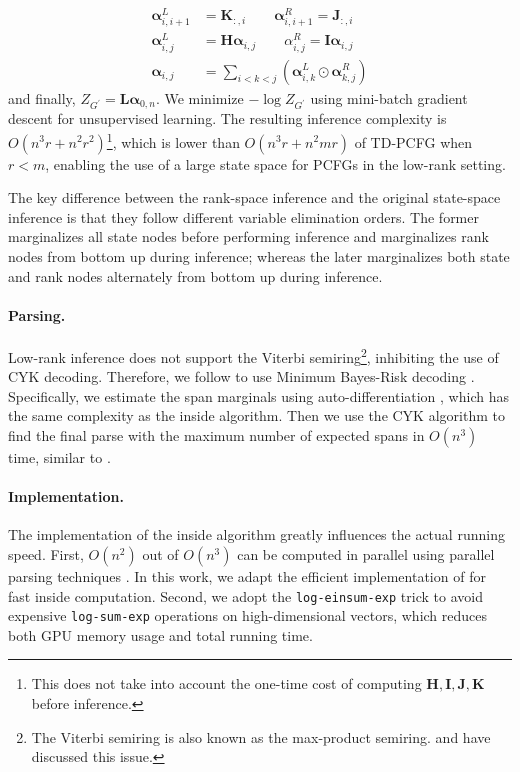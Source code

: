 \documentclass[11pt]{article}
\newcommand{\vect}[1]{\boldsymbol{\mathbf{#1}}}
\begin{document}
\begin{align*}
\vect{\alpha}_{i, i+1}^{L} &= \vect{K}_{:, i} \qquad \vect{\alpha}_{i, i+1}^{R} = \vect{J}_{:, i}\\
\vect{\alpha}_{i, j}^{L} &= \vect{H} \vect{\alpha}_{i, j} \qquad \alpha_{i, j}^{R} = \vect{I} \vect{\alpha}_{i, j} \\
\vect{\alpha}_{i, j} &=  \sum_{i<k<j} (\vect{\alpha}_{i, k}^{L} \odot \vect{\alpha}_{k, j}^{R})
\end{align*}
and finally, $Z_{G^{\prime}}= \vect{L}\vect{\alpha}_{0, n}$.  We minimize $-\log Z_{G^{\prime}}$ using mini-batch gradient descent for unsupervised learning. The resulting inference complexity is $O(n^3r+n^2r^2)$\footnote{This does not take into account the one-time cost of computing $ \vect{H}, \vect{I}, \vect{J}, \vect{K}$ before inference.
}, which is lower than $O(n^3r+n^2mr)$ of TD-PCFG when $r < m$, enabling the use of a large state space for PCFGs in the low-rank setting.  

The key difference between the rank-space inference and the original state-space inference is that they follow different variable elimination orders. The former marginalizes all state nodes before performing inference and marginalizes rank nodes from bottom up during inference; whereas the later marginalizes both state and rank nodes alternately from bottom up during inference.

\paragraph{Parsing.} Low-rank inference does not support the Viterbi semiring\footnote{The Viterbi semiring is also known as the max-product semiring. \citet[][]{chiu2021low} and \citet[][]{yang-etal-2021-pcfgs} have discussed this issue.}, inhibiting the use of CYK decoding. Therefore, we follow \citet{yang-etal-2021-pcfgs} to use Minimum Bayes-Risk decoding \citep{goodman-1996-parsing}. Specifically, we estimate the span marginals using auto-differentiation \cite{eisner-2016-inside,rush-2020-torch}, which has the same complexity as the inside algorithm. Then we use the CYK algorithm to find the final parse with the maximum number of expected spans in $O(n^3)$ time, similar to \citet{smith-eisner-2006-minimum}. 



\paragraph{Implementation.} The implementation of the inside algorithm greatly influences the actual running speed. First, $O(n^2)$ out of $O(n^3)$ can be computed in parallel using parallel parsing techniques \cite{yi-etal-2011-efficient, canny-etal-2013-multi, DBLP:conf/ijcai/ZhangZL20, rush-2020-torch}. In this work, we adapt the efficient implementation of \citet{DBLP:conf/ijcai/ZhangZL20} for fast inside computation. Second, we adopt the \texttt{log-einsum-exp} trick \cite{DBLP:conf/icml/PeharzLVS00BKG20} to avoid expensive \texttt{log-sum-exp} operations on high-dimensional vectors, which reduces both GPU memory usage and total running time.
\end{document}
